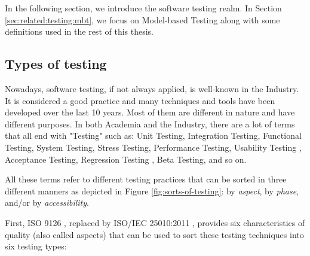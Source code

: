 In the following section, we introduce the software testing
realm. In Section \ref{sec:related:testing:mbt}, we focus on
Model-based Testing along with some definitions used in the rest
of this thesis.

\subsection{Types of testing}

Nowadays, software testing, if not always applied, is well-known
in the Industry. It is considered a good practice and many
techniques and tools have been developed over the last 10 years.
Most of them are different in nature and have different purposes.
In both Academia and the Industry, there are a lot of terms that
all end with "Testing" such as: Unit Testing, Integration
Testing, Functional Testing, System Testing, Stress Testing,
Performance Testing, Usability Testing
\cite{dumas1999practical,Theofanos:2003:BGA:947226.947227},
Acceptance Testing, Regression Testing
\cite{leung1989insights,wong1997study}, Beta Testing, and so on.

All these terms refer to different testing practices that can be
sorted in three different manners as depicted in Figure
\ref{fig:sorts-of-testing}: by \emph{aspect}, by \emph{phase},
and/or by \emph{accessibility}.

First, ISO 9126 \cite{iso9126}, replaced by ISO/IEC 25010:2011
\cite{10951538}, provides six characteristics of quality (also
called aspects) that can be used to sort these testing techniques
into six testing types:

